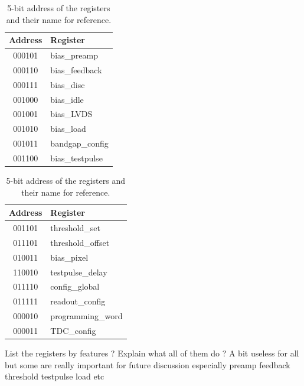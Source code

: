 		\begin{table}[h!]
			\centering
			\begin{minipage}[t]{0.48\textwidth}
			\centering
				\begin{tabular}{|c|l|}
					\hline
					\textbf{Address} & \textbf{Register} \\ \hline
					000101 & bias\_preamp \\ \hline
					000110 & bias\_feedback \\ \hline
					000111 & bias\_disc \\ \hline
					001000 & bias\_idle \\ \hline
					001001 & bias\_LVDS \\ \hline
					001010 & bias\_load \\ \hline
					001011 & bandgap\_config \\ \hline
					001100 & bias\_testpulse \\ \hline
				\end{tabular}
			\end{minipage}
			\hfill
			\begin{minipage}[t]{0.48\textwidth}
			\centering
				\begin{tabular}{|c|l|}
					\hline
					\textbf{Address} & \textbf{Register} \\ \hline
					001101 & threshold\_set \\ \hline
					011101 & threshold\_offset \\ \hline
					010011 & bias\_pixel \\ \hline
					110010 & testpulse\_delay \\ \hline
					011110 & config\_global \\ \hline
					011111 & readout\_config \\ \hline
					000010 & programming\_word \\ \hline
					000011 & TDC\_config \\ \hline
				\end{tabular}
			\end{minipage}

			\caption{5-bit address of the registers and their name for reference.}
			\label{tab:SPI_parameters}
		\end{table}
		
	List the registers by features ? Explain what all of them do ? A bit useless for all but some are really important for future discussion especially preamp feedback threshold testpulse load etc  
		
		
















